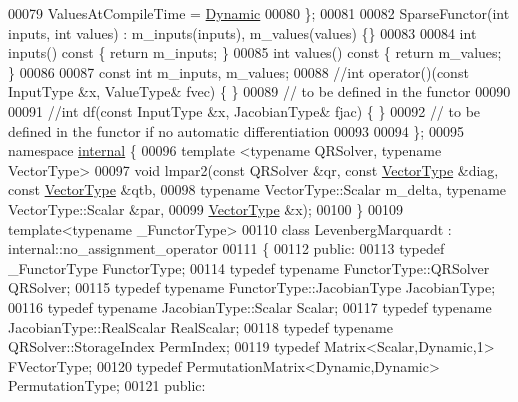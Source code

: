 \begin{DoxyCode}
00079     ValuesAtCompileTime = \hyperlink{namespace_eigen_ad81fa7195215a0ce30017dfac309f0b2}{Dynamic}
00080   \};
00081   
00082   SparseFunctor(\textcolor{keywordtype}{int} inputs, \textcolor{keywordtype}{int} values) : m\_inputs(inputs), m\_values(values) \{\}
00083 
00084   \textcolor{keywordtype}{int} inputs()\textcolor{keyword}{ const }\{ \textcolor{keywordflow}{return} m\_inputs; \}
00085   \textcolor{keywordtype}{int} values()\textcolor{keyword}{ const }\{ \textcolor{keywordflow}{return} m\_values; \}
00086   
00087   \textcolor{keyword}{const} \textcolor{keywordtype}{int} m\_inputs, m\_values;
00088   \textcolor{comment}{//int operator()(const InputType &x, ValueType& fvec) \{ \}}
00089   \textcolor{comment}{// to be defined in the functor}
00090   
00091   \textcolor{comment}{//int df(const InputType &x, JacobianType& fjac) \{ \}}
00092   \textcolor{comment}{// to be defined in the functor if no automatic differentiation}
00093   
00094 \};
00095 \textcolor{keyword}{namespace }\hyperlink{namespaceinternal}{internal} \{
00096 \textcolor{keyword}{template} <\textcolor{keyword}{typename} QRSolver, \textcolor{keyword}{typename} VectorType>
00097 \textcolor{keywordtype}{void} lmpar2(\textcolor{keyword}{const} QRSolver &qr, \textcolor{keyword}{const} \hyperlink{struct_vector_type}{VectorType}  &diag, \textcolor{keyword}{const} 
      \hyperlink{struct_vector_type}{VectorType}  &qtb,
00098         \textcolor{keyword}{typename} VectorType::Scalar m\_delta, \textcolor{keyword}{typename} VectorType::Scalar &par,
00099         \hyperlink{struct_vector_type}{VectorType}  &x);
00100     \}
00109 \textcolor{keyword}{template}<\textcolor{keyword}{typename} \_FunctorType>
00110 \textcolor{keyword}{class }LevenbergMarquardt : internal::no\_assignment\_operator
00111 \{
00112   \textcolor{keyword}{public}:
00113     \textcolor{keyword}{typedef} \_FunctorType FunctorType;
00114     \textcolor{keyword}{typedef} \textcolor{keyword}{typename} FunctorType::QRSolver QRSolver;
00115     \textcolor{keyword}{typedef} \textcolor{keyword}{typename} FunctorType::JacobianType JacobianType;
00116     \textcolor{keyword}{typedef} \textcolor{keyword}{typename} JacobianType::Scalar Scalar;
00117     \textcolor{keyword}{typedef} \textcolor{keyword}{typename} JacobianType::RealScalar RealScalar; 
00118     \textcolor{keyword}{typedef} \textcolor{keyword}{typename} QRSolver::StorageIndex PermIndex;
00119     \textcolor{keyword}{typedef} Matrix<Scalar,Dynamic,1> FVectorType;
00120     \textcolor{keyword}{typedef} PermutationMatrix<Dynamic,Dynamic> PermutationType;
00121   \textcolor{keyword}{public}:

\end{DoxyCode}
